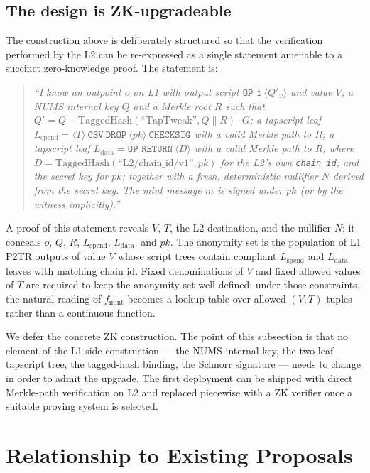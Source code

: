 \documentclass[11pt,a4paper]{article}
\newcommand{\fmint}{f_{\mathrm{mint}}}
\begin{document}
\subsection{The design is ZK-upgradeable}
\label{sec:zkupgrade}

The construction above is deliberately structured so that the verification performed by the L2 can be re-expressed as a single statement amenable to a succinct zero-knowledge proof. The statement is:

\begin{quote}\itshape
``I know an outpoint $o$ on L1 with output script $\texttt{OP\_1}\ \langle Q'_x\rangle$ and value $V$; a NUMS internal key $Q$ and a Merkle root $R$ such that $Q' = Q + \mathrm{TaggedHash}(\text{``TapTweak''}, Q\|R)\cdot G$; a tapscript leaf $L_{\mathrm{spend}} = \langle T\rangle\ \texttt{CSV}\ \texttt{DROP}\ \langle pk\rangle\ \texttt{CHECKSIG}$ with a valid Merkle path to $R$; a tapscript leaf $L_{\mathrm{data}} = \texttt{OP\_RETURN}\ \langle D\rangle$ with a valid Merkle path to $R$, where $D = \mathrm{TaggedHash}(\text{``L2/chain\_id/v1''}, pk)$ for the L2's own \texttt{chain\_id}; and the secret key for $pk$; together with a fresh, deterministic nullifier $N$ derived from the secret key. The mint message $m$ is signed under $pk$ (or by the witness implicitly).''
\end{quote}

A proof of this statement reveals $V$, $T$, the L2 destination, and the nullifier $N$; it conceals $o$, $Q$, $R$, $L_{\mathrm{spend}}$, $L_{\mathrm{data}}$, and $pk$. The anonymity set is the population of L1 P2TR outputs of value $V$ whose script trees contain compliant $L_{\mathrm{spend}}$ and $L_{\mathrm{data}}$ leaves with matching $\mathrm{chain\_id}$. Fixed denominations of $V$ and fixed allowed values of $T$ are required to keep the anonymity set well-defined; under those constraints, the natural reading of $\fmint$ becomes a lookup table over allowed $(V, T)$ tuples rather than a continuous function.

We defer the concrete ZK construction. The point of this subsection is that no element of the L1-side construction --- the NUMS internal key, the two-leaf tapscript tree, the tagged-hash binding, the Schnorr signature --- needs to change in order to admit the upgrade. The first deployment can be shipped with direct Merkle-path verification on L2 and replaced piecewise with a ZK verifier once a suitable proving system is selected.

\section{Relationship to Existing Proposals}
\end{document}

